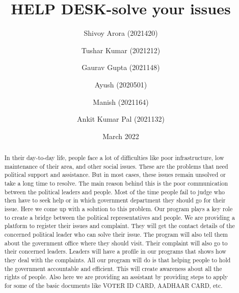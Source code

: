 \documentclass[acmtog]{acmart}
\begin{document}
\title{HELP DESK-solve your issues}

\author{Shivoy Arora (2021420)}

\author{Tushar Kumar (2021212)}

\author{Gaurav Gupta (2021148)}

\author{Ayush (2020501)}

\author{Manish (2021164)}

\author{Ankit Kumar Pal (2021132)}

\date{March 2022}

\begin{abstract}
    In their day-to-day life, people face a lot of difficulties like poor infrastructure, low maintenance of their area, and other social issues. These are the problems that need political support and assistance. But in most cases, these issues remain unsolved or take a long time to resolve. The main reason behind this is the poor communication between the political leaders and people. Most of the time people fail to judge who then have to seek help or in which government department they should go for their issue. Here we come up with a solution to this problem. Our program plays a key role to create a bridge between the political representatives and people. We are providing a platform to register their issues and complaint. They will get the contact details of the concerned political leader who can solve their issue. The program will also tell them about the government office where they should visit. Their complaint will also go to their concerned leaders. Leaders will have a profile in our programs that shows how they deal with the complaints. All our program will do is that helping people to hold the government accountable and efficient. This will create awareness about all the rights of people. Also here we are providing an assistant by providing steps to apply for some of the basic documents like VOTER ID CARD, AADHAAR CARD, etc.
\end{abstract}

\maketitle
\end{document}
